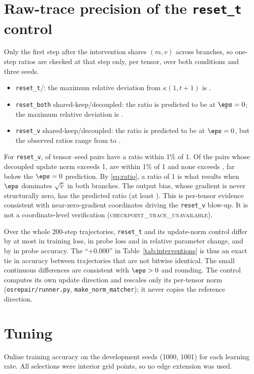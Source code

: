 \section{Raw-trace precision of the \texttt{reset\_t} control}
\label{app:trace}
Only the first step after the intervention shares $(m,v)$ across branches, so one-step
ratios are checked at that step only, per tensor, over both conditions and three seeds.
\begin{itemize}
\item \texttt{reset\_t}/\keep: the maximum relative deviation from $\kappa(1,t{+}1)$ is \TraceResetTDev.
\item \texttt{reset\_both} shared-keep/decoupled: the ratio is predicted to be \TraceBothSkPred{} at
$\eps=0$; the maximum relative deviation is \TraceBothSkDev.
\item \texttt{reset\_v} shared-keep/decoupled: the ratio is predicted to be \TraceVSkPred{} at $\eps=0$,
but the observed ratios range from \TraceVSkMin{} to \TraceVSkMax.
\end{itemize}
For \texttt{reset\_v}, \TraceVSkEpsLimited{} of \TraceVSkTensors{} tensor--seed pairs have a ratio within
1\% of 1. Of the \TraceVSkBigCount{} pairs whose decoupled update norm exceeds 1, \TraceVSkBigNearOne{}
are within 1\% of 1 and none exceeds \TraceVSkBigMaxRatio, far below the $\eps=0$ prediction. By \eqref{eq:ratio}, a ratio of
1 is what results when $\eps$ dominates $\sqrt{\hat v}$ in both branches. The output bias, whose gradient
is never structurally zero, has the predicted ratio (at least \TraceVSkBiasMin). This is per-tensor
evidence consistent with near-zero-gradient coordinates driving the \texttt{reset\_v} blow-up. It is not
a coordinate-level verification (\textsc{checkpoint\_trace\_unavailable}).

Over the whole 200-step trajectories, \texttt{reset\_t} and its update-norm control differ by at most
\TrajLossDiff{} in training loss, \TrajProbeLossDiff{} in probe loss and \TrajThetaDiff{} in relative
parameter change, and by \TrajProbeAccDiff{} in probe accuracy. The ``$+0.000$'' in
Table~\ref{tab:interventions} is thus an exact tie in accuracy between trajectories that are not
bitwise identical. The small continuous differences are consistent with $\eps>0$ and rounding. The
control computes its own update direction and rescales only its per-tensor norm
(\texttt{osrepair/runner.py}, \texttt{make\_norm\_matcher}); it never copies the reference direction.

\section{Tuning}
\label{app:tuning}
Online training accuracy on the development seeds (1000, 1001) for each learning rate. All selections
were interior grid points, so no edge extension was used.
\begin{center}\scriptsize

\end{center}

